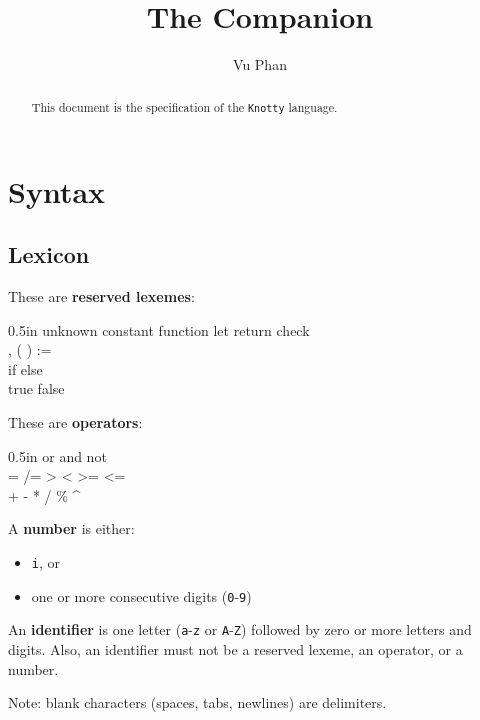 \documentclass[letterpaper, 12pt]{extarticle}
\title{The \kn{} Companion}
\author{Vu Phan}
\theoremstyle{definition} %
\newcommand{\textdef}[1]{\textbf{#1}}
\newcommand{\code}[1]{\texttt{#1}}
\newcommand{\kn}{\code{Knotty}}
\newenvironment{codeblock}
    {\begin{addmargin}{0.5in} \ttfamily}
    {\end{addmargin}}
\begin{document}
\maketitle

\begin{abstract}
This document is the specification of the \kn{} language.
\end{abstract}

\tableofcontents

\thispagestyle{fancy}


\newpage

\section{Syntax}


\subsection{Lexicon}

These are \textdef{reserved lexemes}:
\begin{codeblock}
unknown constant function let return check \\
, ( ) := \\
if else \\
true false
\end{codeblock}

These are \textdef{operators}:
\begin{codeblock}
or and not \\
= /= > < >= <= \\
+ - * / \% \^{}
\end{codeblock}

A \textdef{number} is either:
\begin{itemize}
\item \code{i}, or
\item one or more consecutive digits (\code{0}-\code{9})
\end{itemize}

An \textdef{identifier} is one letter
(\code{a}-\code{z} or \code{A}-\code{Z})
followed by zero or more letters and digits.
Also, an identifier must not be a reserved lexeme,
an operator, or a number.

Note: blank characters (spaces, tabs, newlines)
are delimiters.
\end{document}
